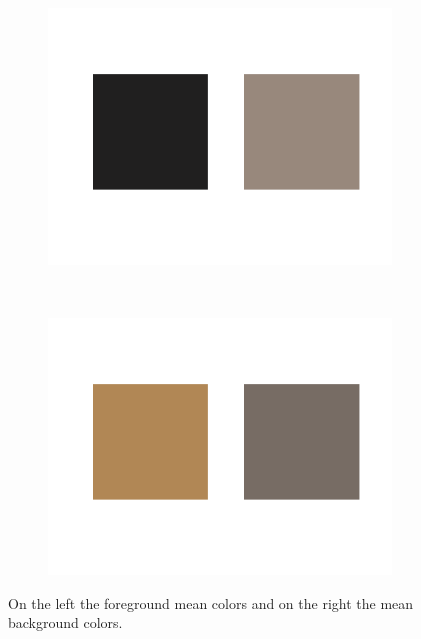 \documentclass{paper}
\begin{document}
\begin{figure}[H]
    \centering
    \begin{subfigure}{0.45\textwidth}
        \includegraphics[width=\textwidth]{../../outputs/p4/image_segmentation/zebra2/mean_fg}
    \end{subfigure}
    ~
        \begin{subfigure}{0.45\textwidth}
        \includegraphics[width=\textwidth]{../../outputs/p4/image_segmentation/zebra2/mean_bg}
    \end{subfigure}
    
    \caption{On the left the foreground mean colors and on the right the mean background colors.}
    \label{fig:segmentation_zebra2_mean_colors}       
\end{figure}
\end{document}
